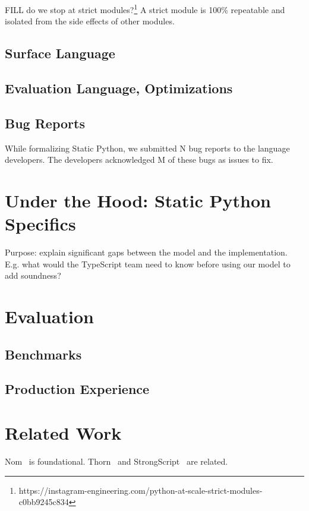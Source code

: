 \documentclass[a4paper,english,cleveref,autoref,thm-restate,anonymous,]{lipics-v2021}
\begin{document}
FILL do we stop at strict modules?\footnote{https://instagram-engineering.com/python-at-scale-strict-modules-c0bb9245c834}
A strict module is 100\% repeatable and isolated from the side effects of other modules.



\subsection{Surface Language}


\subsection{Evaluation Language, Optimizations}


\subsection{Bug Reports}

While formalizing Static Python, we submitted N bug reports to the language developers.
The developers acknowledged M of these bugs as issues to fix.


\section{Under the Hood: Static Python Specifics}
\label{s:impl}

Purpose: explain significant gaps between the model and the implementation.
E.g. what would the TypeScript team need to know before using our model
to add soundness?


\section{Evaluation}
\label{s:eval}


\subsection{Benchmarks}


\subsection{Production Experience}


\section{Related Work}

Nom~\cite{mt-oopsla-2017} is foundational.
Thorn~\cite{wnlov-popl-2010} and StrongScript~\cite{rzv-ecoop-2015} are related.
\end{document}
